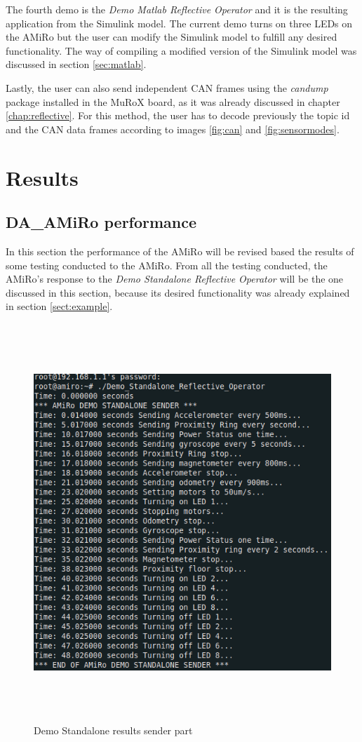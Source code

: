 \documentclass[12pt]{report}%
\begin{document}
The fourth demo is the \textit{Demo Matlab Reflective Operator} and it is the resulting application from the Simulink model. The current demo turns on three LEDs on the AMiRo but the user can modify the Simulink model to fulfill any desired functionality. The way of compiling a modified version of the Simulink model was discussed in section \ref{sec:matlab}.

Lastly, the user can also send independent CAN frames using the \textit{candump} package installed in the MuRoX board, as it was already discussed in chapter \ref{chap:reflective}. For this method, the user has to decode previously the topic id and the CAN data frames according to images \ref{fig:can} and \ref{fig:sensormodes}.

\chapter{Results}
\section{DA\_AMiRo performance}
In this section the performance of the AMiRo will be revised based the results of some testing conducted to the AMiRo. From all the testing conducted, the AMiRo's response to the \textit{Demo Standalone Reflective Operator} will be the one discussed in this section, because its desired functionality was already explained in section \ref{sect:example}.

\begin{figure}[ht]
	\centering
	\includegraphics[width=\textwidth, height=15cm]{standalone_sender}
  	\caption{Demo Standalone results sender part}
  	\label{fig:ressend}
\end{figure}
\end{document}
